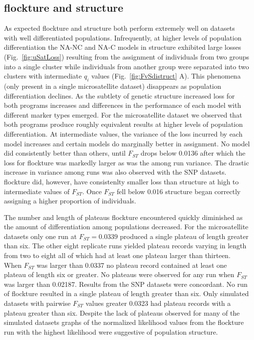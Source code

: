\subsection*{{\sc flockture} and {\sc structure}} 
As expected {\sc flockture} and {\sc structure} both perform extremely well on datasets with
well differentiated populations. Infrequently, at higher levels of population differentiation the 
NA-NC and NA-C models in {\sc structure} exhibited large losses (Fig.~\ref{fig:uSatLoss})
resulting from the assignment of individuals from two groups into a single cluster while 
individuals from another group were separated into two clusters
with intermediate $q_i$ values (Fig.~\ref{fig:FvSdistruct}  A). This phenomena 
(only present in a single microsatellite dataset) disappears as population differentiation 
declines. As the subtlety of genetic structure 
increased loss for both programs increases and differences in the performance of
each model with different marker types emerged.
For the microsatellite dataset we observed that both programs
produce roughly equivalent results at higher levels of population differentiation. At intermediate 
values, the variance of the loss incurred by each model increases and certain models do marginally
better in assignment. No model did consistently better than others, until $F_{ST}$ drops 
below 0.0136 after which the loss for {\sc flockture} was markedly larger as was the among run
variance. The drastic increase in variance among runs was also observed with the SNP datasets. 
 {\sc flockture} did, however, have consistenlty smaller loss than  {\sc structure} at high to intermediate 
values of $F_{ST}$. Once $F_{ST}$ fell below 0.016 {\sc structure} began correctly assigning a 
higher proportion of individuals. 

The number and length of plateaus {\sc flockture} encountered quickly 
diminished as the amount of differentiation among populations decreased. For the microsatellite datasets
only one run at $F_{ST} = 0.0339$ produced a single plateau of length greater than six. The other eight 
replicate runs yielded plateau records varying in length from two to eight all of which had at 
least one plateau larger than thirteen. When $F_{ST}$ was larger than 0.0337 no plateau record
contained at least one plateau of length six or greater. No plateaus were observed for any run when 
$F_{ST}$ was larger than 0.02187. Results from the SNP datasets
were concordant. No run of {\sc flockture} resulted in a single plateau of length greater than six.
Only simulated datasets with pairwise $F_{ST}$ values greater 0.0323 had plateau records with a 
plateau greater than six. Despite the lack of plateaus observed for many of the simulated datasets 
graphs of the normalized likelihood values from the {\sc flockture} run with the highest 
likelihood were suggestive of population structure.  

